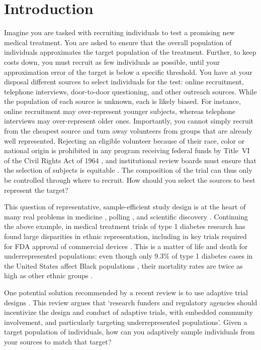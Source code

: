 \documentclass[twoside]{article}
\begin{document}
\section{Introduction}
Imagine you are tasked with recruiting individuals to test a promising new medical treatment. You are asked to ensure that the overall population of individuals approximates the target population of the treatment. Further, to keep costs down, you must recruit as few individuals as possible, until your approximation error of the target is below a specific threshold. You have at your disposal different sources to select individuals for the test: online recruitment, telephone interviews, door-to-door questioning, and other outreach sources. While the population of each source is unknown, each is likely biased. For instance, online recruitment may over-represent younger subjects, whereas telephone interviews may over-represent older ones. Importantly, you cannot simply recruit from the cheapest source and turn away volunteers from groups that are already well represented. Rejecting an eligible volunteer because of their race, color or national origin is prohibited in any program receiving federal funds by Title~VI of the Civil Rights Act of 1964 \citep{titleVI1964}, and institutional review boards must ensure that the selection of subjects is equitable \citep{commonrule2018}. The composition of the trial can thus only be controlled through where to recruit. How should you select the sources to best represent the target?

This question of representative, sample-efficient study design is at the heart of many real problems in medicine \citep{sanathanan1991randomized}, polling \citep{gelman2016high}, and scientific discovery \citep{gao2022sample}. Continuing the above example, in medical treatment trials of type 1 diabetes research has found large disparities in ethnic representation, including in key trials required for FDA approval of commercial devices \citep{akturk2021inequity}. This is a matter of life and death for underrepresented populations: even though only 9.3\% of type 1 diabetes cases in the United States affect Black populations \citep{akturk2021inequity}, their mortality rates are twice as high as other ethnic groups \citep{saydah2017disparities}. 

One potential solution recommended by a recent review is to use adaptive trial
designs \citep{goshrani2026role}. This review argues that `research funders
and regulatory agencies should incentivize the design and conduct of adaptive
trials, with embedded community involvement, and particularly targeting
underrepresented populations'. Given a target population of individuals, how
can you adaptively sample individuals from your sources to match that target?
\end{document}
